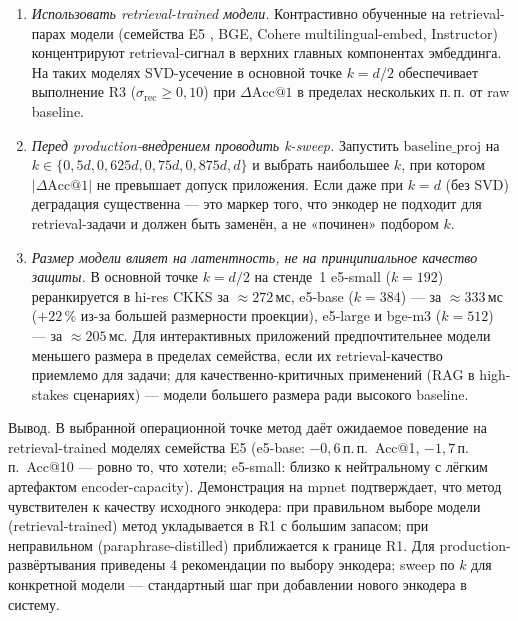 \documentclass[a4paper, 12pt, oneside, openany]{article}
\begin{document}
\begin{enumerate}
\item \emph{Использовать retrieval-trained модели.} Контрастивно обученные на retrieval-парах модели (семейства E5 \cite{ref30}, BGE, Cohere multilingual-embed, Instructor) концентрируют retrieval-сигнал в верхних главных компонентах эмбеддинга. На таких моделях SVD-усечение в основной точке $k = d/2$ обеспечивает выполнение R3 ($\sigma_{\mathrm{rec}} \geq 0{,}10$) при $\Delta\mathrm{Acc@1}$ в пределах нескольких п.\,п. от raw baseline.


\item \emph{Перед production-внедрением проводить k-sweep.} Запустить $\mathrm{baseline\_proj}$ на $k \in \{0{,}5d, 0{,}625d, 0{,}75d, 0{,}875d, d\}$ и выбрать наибольшее $k$, при котором $|\Delta\mathrm{Acc@1}|$ не превышает допуск приложения. Если даже при $k = d$ (без SVD) деградация существенна --- это маркер того, что энкодер не подходит для retrieval-задачи и должен быть заменён, а не «починен» подбором $k$.

\item \emph{Размер модели влияет на латентность, не на принципиальное качество защиты.} В основной точке $k = d/2$ на стенде~1 e5-small ($k = 192$) реранкируется в hi-res CKKS за $\approx 272$\,мс, e5-base ($k = 384$) --- за $\approx 333$\,мс ($+22\,\%$ из-за большей размерности проекции), e5-large и bge-m3 ($k = 512$) --- за $\approx 205$\,мс. Для интерактивных приложений предпочтительнее модели меньшего размера в пределах семейства, если их retrieval-качество приемлемо для задачи; для качественно-критичных применений (RAG в high-stakes сценариях) --- модели большего размера ради высокого baseline.
\end{enumerate}

Вывод. В выбранной операционной точке метод даёт ожидаемое поведение на retrieval-trained моделях семейства E5 (e5-base: $-0{,}6$\,п.\,п.\ Acc@1, $-1{,}7$\,п.\,п.\ Acc@10 --- ровно то, что хотели; e5-small: близко к нейтральному с лёгким артефактом encoder-capacity). Демонстрация на mpnet подтверждает, что метод чувствителен к качеству исходного энкодера: при правильном выборе модели (retrieval-trained) метод укладывается в R1 с большим запасом; при неправильном (paraphrase-distilled) приближается к границе R1. Для production-развёртывания приведены 4 рекомендации по выбору энкодера; sweep по $k$ для конкретной модели --- стандартный шаг при добавлении нового энкодера в систему.
\end{document}
